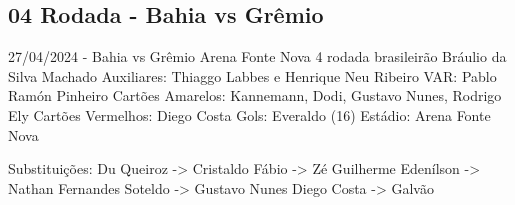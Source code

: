 \newpage
\subsection{04 Rodada - Bahia vs Grêmio}

\begin{figure}[H]
    \centering
    
\end{figure}

27/04/2024 - Bahia vs Grêmio
Arena Fonte Nova
4 rodada brasileirão
Bráulio da Silva Machado
Auxiliares: Thiaggo Labbes e Henrique Neu Ribeiro
VAR: Pablo Ramón Pinheiro
Cartões Amarelos: Kannemann, Dodi, Gustavo Nunes, Rodrigo Ely
Cartões Vermelhos: Diego Costa
Gols: Everaldo (16)
Estádio: Arena Fonte Nova

Substituições:
Du Queiroz -> Cristaldo
Fábio -> Zé Guilherme
Edenílson -> Nathan Fernandes
Soteldo -> Gustavo Nunes
Diego Costa -> Galvão